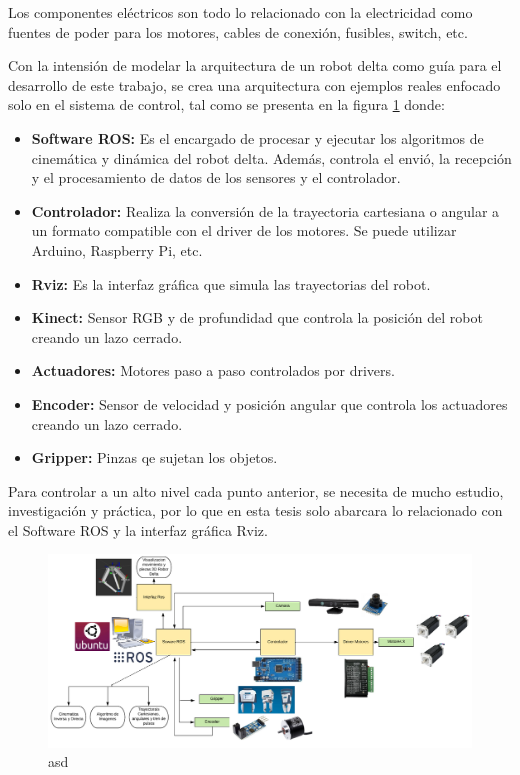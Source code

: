     Los componentes eléctricos son todo lo relacionado con la electricidad como fuentes de poder para los motores, cables de conexión, fusibles, switch, etc.
    
    Con la intensión de modelar la arquitectura de un robot delta como guía para el desarrollo de este trabajo, se crea una arquitectura con ejemplos reales enfocado solo en el sistema de control, tal como se presenta en la figura \ref{f:Cap3-2_esquema_sistema_control} donde:
    
    \begin{itemize}
        \item \textbf{Software ROS:} Es el encargado de procesar y ejecutar los algoritmos de cinemática y dinámica del robot delta. Además, controla el envió, la recepción y el procesamiento de datos de los sensores y el controlador.
        \item \textbf{Controlador:} Realiza la conversión de la trayectoria cartesiana o angular a un formato compatible con el driver de los motores. Se puede utilizar Arduino, Raspberry Pi, etc.
        \item \textbf{Rviz:} Es la interfaz gráfica que simula las trayectorias del robot.
        \item \textbf{Kinect:} Sensor RGB y de profundidad que controla la posición del robot creando un lazo cerrado.
        \item \textbf{Actuadores:} Motores paso a paso controlados por drivers.
        \item \textbf{Encoder:} Sensor de velocidad y posición angular que controla los actuadores creando un lazo cerrado.
        \item \textbf{Gripper:} Pinzas qe sujetan los objetos.
    \end{itemize}
    
    Para controlar a un alto nivel cada punto anterior, se necesita de mucho estudio, investigación y práctica, por lo que en esta tesis solo abarcara lo relacionado con el Software ROS y la interfaz gráfica Rviz.  
    
    \begin{figure}[htb]
        \centering
        \includegraphics[width=1\linewidth]{Main/Chapter3/Images3/3-2/sistema-de-control.png}
        \caption{asd}
        \label{f:Cap3-2_esquema_sistema_control}
    \end{figure}
    
